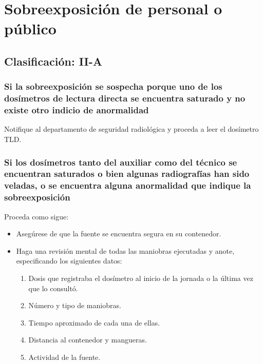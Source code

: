 \section{Sobreexposición de personal o público}

\subsection*{Clasificación: II-A}

\subsubsection{Si la sobreexposición se sospecha porque uno de los dosímetros de lectura directa se encuentra saturado y no existe otro indicio de anormalidad}
Notifique al departamento de seguridad radiológica y proceda a leer el dosímetro TLD.

\subsubsection{Si los dosímetros tanto del auxiliar como del técnico se encuentran saturados o bien algunas radiografías han sido veladas, o se encuentra alguna anormalidad que indique la sobreexposición}
Proceda como sigue:

\begin{itemize}
    \item Asegúrese de que la fuente se encuentra segura en su contenedor.
    \item Haga una revisión mental de todas las maniobras ejecutadas y anote, especificando los siguientes datos:
    \begin{enumerate}
        \item Dosis que registraba el dosímetro al inicio de la jornada o la última vez que lo consultó.
        \item Número y tipo de maniobras.
        \item Tiempo aproximado de cada una de ellas.
        \item Distancia al contenedor y mangueras.
        \item Actividad de la fuente.
    \end{enumerate}
\end{itemize}